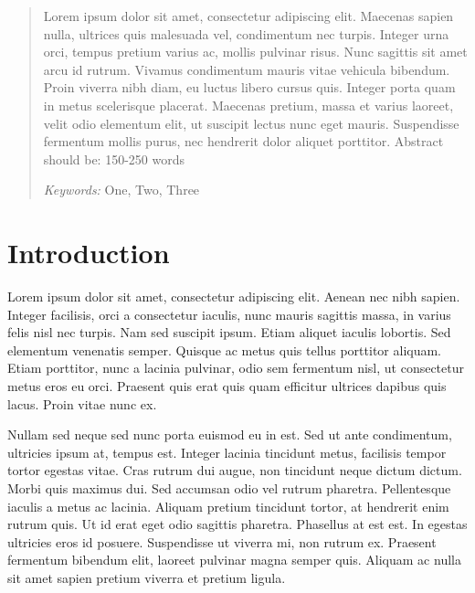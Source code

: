 \documentclass[10pt,twoside,twocolumn,notitle,a4paper]{IEEEtran}
\newenvironment{notation}{%
   \def\FrameCommand{\colorbox{yellow!20}}%
   \MakeFramed{\advance\hsize-\width \FrameRestore}}
 {\endMakeFramed}
\begin{document}
\begin{abstract}
Lorem ipsum dolor sit amet, consectetur adipiscing elit. Maecenas sapien nulla, ultrices quis malesuada vel, condimentum nec turpis. Integer urna orci, tempus pretium varius ac, mollis pulvinar risus. Nunc sagittis sit amet arcu id rutrum. Vivamus condimentum mauris vitae vehicula bibendum. Proin viverra nibh diam, eu luctus libero cursus quis. Integer porta quam in metus scelerisque placerat. Maecenas pretium, massa et varius laoreet, velit odio elementum elit, ut suscipit lectus nunc eget mauris. Suspendisse fermentum mollis purus, nec hendrerit dolor aliquet porttitor.
\begin{notation}
Abstract should be: 150-250 words
\end{notation}

\begin{center}
\textit{Keywords:} One, Two, Three
\end{center}

\end{abstract}



\newpage
\section{Introduction}
Lorem ipsum dolor sit amet, consectetur adipiscing elit. Aenean nec nibh sapien. Integer facilisis, orci a consectetur iaculis, nunc mauris sagittis massa, in varius felis nisl nec turpis. Nam sed suscipit ipsum. Etiam aliquet iaculis lobortis. Sed elementum venenatis semper. Quisque ac metus quis tellus porttitor aliquam. Etiam porttitor, nunc a lacinia pulvinar, odio sem fermentum nisl, ut consectetur metus eros eu orci. Praesent quis erat quis quam efficitur ultrices dapibus quis lacus. Proin vitae nunc ex.

Nullam sed neque sed nunc porta euismod eu in est. Sed ut ante condimentum, ultricies ipsum at, tempus est. Integer lacinia tincidunt metus, facilisis tempor tortor egestas vitae. Cras rutrum dui augue, non tincidunt neque dictum dictum. Morbi quis maximus dui. Sed accumsan odio vel rutrum pharetra. Pellentesque iaculis a metus ac lacinia. Aliquam pretium tincidunt tortor, at hendrerit enim rutrum quis. Ut id erat eget odio sagittis pharetra. Phasellus at est est. In egestas ultricies eros id posuere. Suspendisse ut viverra mi, non rutrum ex. Praesent fermentum bibendum elit, laoreet pulvinar magna semper quis. Aliquam ac nulla sit amet sapien pretium viverra et pretium ligula.
\end{document}
